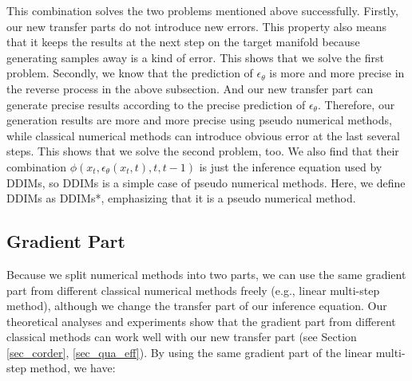 \documentclass{article}
\begin{document}
This combination solves the two problems mentioned above successfully. Firstly, our new transfer parts do not introduce new errors. This property also means that it keeps the results at the next step on the target manifold because generating samples away is a kind of error. This shows that we solve the first problem. Secondly, we know that the prediction of $\epsilon_\theta$ is more and more precise in the reverse process in the above subsection. And our new transfer part can generate precise results according to the precise prediction of $\epsilon_\theta$. Therefore, our generation results are more and more precise using pseudo numerical methods, while classical numerical methods can introduce obvious error at the last several steps. This shows that we solve the second problem, too. We also find that their combination $\phi(x_t, \epsilon_\theta(x_t, t), t, t-1)$ is just the inference equation used by DDIMs, so DDIMs is a simple case of pseudo numerical methods. Here, we define DDIMs as DDIMs*, emphasizing that it is a pseudo numerical method.


\subsection{Gradient Part}
\label{LMSM}

Because we split numerical methods into two parts, we can use the same gradient part from different classical numerical methods freely (e.g., linear multi-step method), although we change the transfer part of our inference equation. Our theoretical analyses and experiments show that the gradient part from different classical methods can work well with our new transfer part (see Section \ref{sec_corder}, \ref{sec_qua_eff}). By using the same gradient part of the linear multi-step method, we have:
\end{document}
